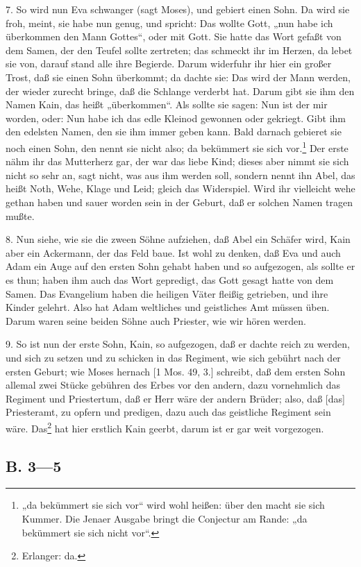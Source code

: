 7. So wird nun Eva schwanger (sagt Moses), und gebiert einen Sohn. Da wird sie froh, meint, sie habe nun genug, und spricht: Das wollte Gott, „nun habe ich überkommen den Mann Gottes“, oder mit Gott. Sie hatte das Wort gefaßt von dem Samen, der den Teufel
sollte zertreten; das schmeckt ihr im Herzen, da lebet sie von, darauf stand alle ihre Begierde. Darum widerfuhr ihr hier ein großer Trost, daß sie einen Sohn überkommt; da dachte sie: Das wird der Mann werden, der wieder zurecht bringe, daß die Schlange verderbt hat. Darum gibt sie ihm den Namen Kain, das heißt „überkommen“. Als sollte sie sagen: Nun ist der mir worden, oder: Nun habe ich das edle Kleinod gewonnen oder gekriegt. Gibt ihm den edelsten Namen, den sie ihm immer geben kann. Bald darnach gebieret sie noch einen Sohn, den nennt sie nicht also; da bekümmert sie sich vor.\footnote{„da bekümmert sie sich vor“ wird wohl heißen: über den macht sie sich Kummer. Die Jenaer Ausgabe bringt die Conjectur am Rande: „da bekümmert sie sich nicht vor“.} Der erste nähm ihr das Mutterherz gar, der war das liebe Kind; dieses aber nimmt sie sich nicht so sehr an, sagt nicht, was aus ihm werden soll, sondern nennt ihn Abel, das heißt Noth, Wehe, Klage und Leid; gleich das Widerspiel. Wird ihr vielleicht wehe gethan haben und sauer worden sein in der Geburt, daß er solchen Namen tragen mußte.

8. Nun siehe, wie sie die zween Söhne aufziehen, daß Abel ein Schäfer wird, Kain aber ein Ackermann, der das Feld baue. Ist wohl zu denken, daß Eva und auch Adam ein Auge auf den ersten Sohn gehabt haben und so aufgezogen, als sollte er es thun; haben ihm auch das Wort gepredigt, das Gott gesagt hatte von dem Samen. Das Evangelium haben die heiligen Väter fleißig getrieben, und ihre Kinder gelehrt. Also hat Adam weltliches und geistliches Amt müssen üben. Darum waren seine beiden Söhne auch Priester, wie wir hören werden.

9. So ist nun der erste Sohn, Kain, so aufgezogen, daß er dachte reich zu werden, und sich zu setzen und zu schicken in das Regiment, wie sich gebührt nach der ersten Geburt; wie Moses hernach [1 Mos. 49, 3.] schreibt, daß dem ersten Sohn allemal zwei Stücke gebühren des Erbes vor den andern, dazu vornehmlich das Regiment und Priestertum, daß er Herr wäre der andern Brüder; also, daß [das] Priesteramt, zu opfern und predigen, dazu auch das geistliche Regiment sein wäre. Das\footnote{Erlanger: da.} hat hier erstlich Kain geerbt, darum ist er gar weit vorgezogen.

\subsection[B. 3—5]{B. 3—5}

